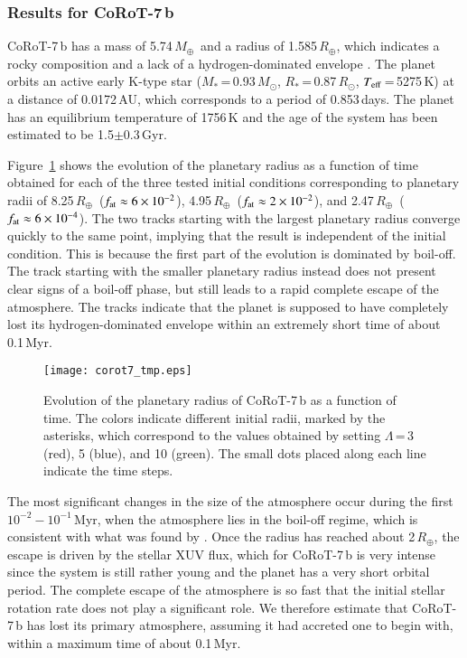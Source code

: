 \documentclass{aa}
\def\Teff{$T_{\rm eff}$}
\def\Re{\ensuremath{R_{\oplus}}}
\def\Me{\ensuremath{M_{\oplus}}}
\def\Mo{\ensuremath{M_{\odot}}}
\def\Ro{\ensuremath{R_{\odot}}}
\begin{document}
\subsubsection{Results for CoRoT-7\,b}
%
CoRoT-7\,b has a mass of 5.74\,\Me\ and a radius of 1.585\,\Re,
which indicates a rocky composition and a lack of a
hydrogen-dominated envelope \citep{leger2009,mura2011,barros2014}.
The planet orbits an {active} early K-type star
($M_*$\,=\,0.93\,\Mo, $R_*$\,=\,0.87\,\Ro, \Teff\,=\,5275\,K) at a
distance of 0.0172\,AU, which corresponds to a period of
0.853\,days. The planet has an equilibrium temperature of 1756\,K
and the age of the system has been estimated to be
1.5$\pm$0.3\,Gyr.

Figure~\ref{fig:corot7b} shows the evolution of the planetary
radius as a function of time obtained for each of the three tested
initial conditions corresponding to planetary radii of 8.25\,\Re\
($f_{\rm at} \approx 6\times 10^{-2}$), 4.95\,\Re\  ($f_{\rm at}
\approx 2\times 10^{-2}$), and 2.47\,\Re\  ($f_{\rm at} \approx
6\times 10^{-4}$). The two tracks starting with the largest
planetary radius converge {quickly} to the same point, implying
that the result is independent of the initial condition. This is
because the first part of the evolution is dominated by boil-off.
The track starting with the smaller planetary radius instead does
not present clear signs of a boil-off phase, but still {leads} to
a rapid complete escape of the atmosphere. The tracks indicate
that the planet is supposed to have {completely lost its
hydrogen-dominated envelope within an extremely short time of
about 0.1\,Myr.}
\begin{figure}
\texttt{[image: corot7\_tmp.eps]}
\caption{{Evolution of the planetary radius of CoRoT-7\,b as a
function of time. The colors indicate different initial radii,
marked by the asterisks, which correspond to the values obtained
by setting $\Lambda$\,=\,3 (red), 5 (blue), and 10 (green). The
small dots placed along each line indicate the time steps.}}
\label{fig:corot7b}
\end{figure}

The most significant changes in the size of the atmosphere occur during the first $10^{-2} - 10^{-1}$\,Myr, when the atmosphere lies in the boil-off regime, which is consistent with what was found by \citet{owen2016b}. Once the radius has reached about 2\,\Re, the escape is driven by the stellar XUV flux, which for CoRoT-7\,b is very intense since the system is still rather young and the planet has a very short orbital period. The complete escape of the atmosphere is so fast that the initial stellar rotation rate \citep[see, e.g.,][]{tu2015} does not play a significant role. We therefore estimate that CoRoT-7\,b has lost its primary atmosphere, assuming it had accreted one to begin with, within a maximum time of about 0.1\,Myr.
\end{document}

